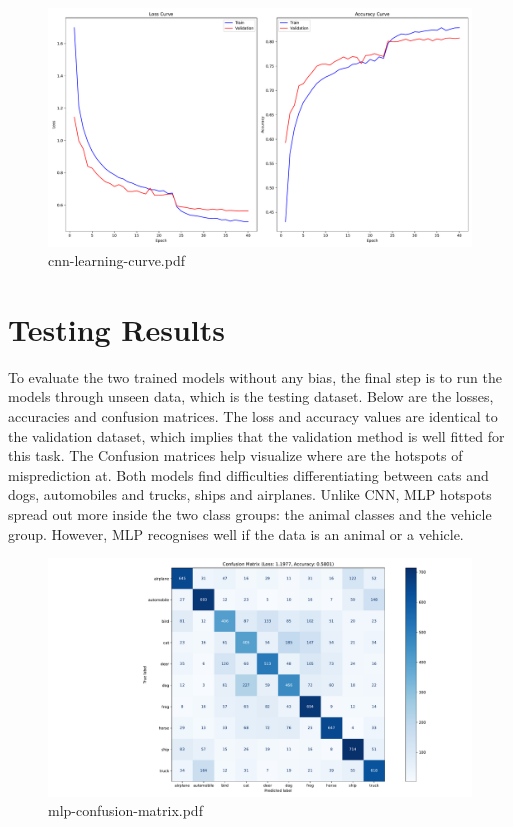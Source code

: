\documentclass{report}
\begin{document}
\begin{figure}[ht!]
    \center
    \includegraphics[scale=0.41]{../output/cnn-learning-curve.pdf}
    \caption{cnn-learning-curve.pdf}
\end{figure}

\section{Testing Results}
To evaluate the two trained models without any bias, the final step is to run the models through unseen data, 
which is the testing dataset. Below are the losses, accuracies and confusion matrices. The loss and accuracy 
values are identical to the validation dataset, which implies that the validation method is well fitted for this task. 
The Confusion matrices help visualize where are the hotspots of misprediction at. Both models find difficulties differentiating 
between cats and dogs, automobiles and trucks, ships and airplanes. Unlike CNN, MLP hotspots spread out more inside the two class 
groups: the animal classes and the vehicle group. However, MLP recognises well if the data is an animal or a vehicle.

\begin{figure}[ht!]
    \center
    \includegraphics[scale=0.41]{../output/mlp-confusion-matrix.pdf}
    \caption{mlp-confusion-matrix.pdf}
\end{figure}
\end{document}
